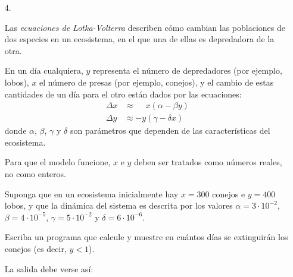 \documentclass[11pt,spanish]{article}
\begin{document}
\begin{enumerate}[font=\Large\bfseries]
      \begin{minipage}[t]{.40\textwidth}
        
      \end{minipage}

    \newpage
    \item[4.]

      Las \emph{ecuaciones de Lotka-Volterra}
      describen cómo cambian las poblaciones de dos especies en un ecosistema,
      en el que una de ellas es depredadora de la otra.

      En un día cualquiera,
      \(y\) representa el número de depredadores (por ejemplo, lobos),
      \(x\) el número de presas (por ejemplo, conejos),
      y el cambio de estas cantidades de un día para el otro
      están dados por las ecuaciones:
      \begin{align*}
        \Delta x &\approx \phantom{-}x(\alpha - \beta  y) \\
        \Delta y &\approx           -y(\gamma - \delta x)
      \end{align*}
      donde \(\alpha\), \(\beta\), \(\gamma\) y \(\delta\)
      son parámetros que dependen de las características del ecosistema.

      Para que el modelo funcione,
      \(x\) e \(y\) deben ser tratados como números reales,
      no como enteros.

      Suponga que en un ecosistema inicialmente hay
      \(x = 300\) conejos e \(y = 400\) lobos,
      y que la dinámica del sistema es descrita por los valores
      \(\alpha = 3\cdot 10^{-2}\),
      \(\beta  = 4\cdot 10^{-5}\),
      \(\gamma = 5\cdot 10^{-2}\) y
      \(\delta = 6\cdot 10^{-6}\).

      Escriba un programa que calcule y muestre
      en cuántos días se extinguirán los conejos
      (es decir, \(y < 1\)).

      La salida debe verse así:

      \begin{minipage}[t]{.60\textwidth}
        
      \end{minipage}

  \end{enumerate}
\end{document}
